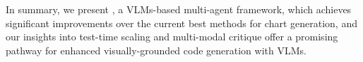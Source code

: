 
In summary, we present \model{}, a VLMs-based multi-agent framework, which achieves significant improvements over the current best methods for chart generation, and our insights into test-time scaling and multi-modal critique offer a promising pathway for enhanced visually-grounded code generation with VLMs.